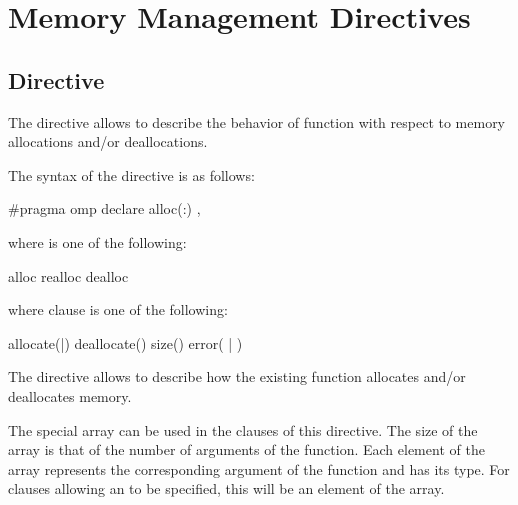 \section{Memory Management Directives}
\label{sec:Memory Management Directives}

\subsection{ Directive}
\label{subsec:declare alloc Directive}

\begin{ccppspecific}

\summary

The  directive allows to describe the behavior of function with respect to memory allocations and/or deallocations.

\syntax

The syntax of the  directive is as follows:

\begin{boxedcode}
#pragma omp declare alloc(\plc{[ kind }:\plc{]function-name}) \plc{[clause[ [ [},\plc{] clause] ... ]] new-line}
\end{boxedcode}

where  is one of the following: 
\begin{indentedcodelist}
alloc
realloc
dealloc
\end{indentedcodelist}

where clause is one of the following:
\begin{indentedcodelist}
allocate(|)
deallocate()
size()
error( | )
\end{indentedcodelist}

\descr

The  directive allows to describe how the existing  function allocates and/or deallocates memory.

The special array  can be used in the clauses of this directive. The size of the  array is that of the number of arguments of the  function. Each element of the array represents the corresponding argument of the function and has its type. For clauses allowing an  to be specified, this will be an element of the  array.


\end{ccppspecific}
